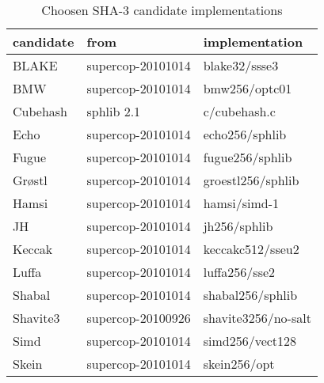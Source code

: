 \begin{table}
  \centering
  \begin{tabular}{ | l | l | l | }
    \hline
    \textbf{candidate} & \textbf{from} & \textbf{implementation} \\ \hline
     BLAKE      & supercop-20101014 & blake32/ssse3 \\ \hline
     \ac{BMW}   & supercop-20101014 & bmw256/optc01 \\ \hline
     Cubehash   & sphlib 2.1        & c/cubehash.c  \\ \hline
     Echo       & supercop-20101014 & echo256/sphlib\\ \hline
     Fugue      & supercop-20101014 & fugue256/sphlib\\ \hline
     Grøstl    & supercop-20101014 & groestl256/sphlib\\ \hline
     Hamsi      & supercop-20101014 & hamsi/simd-1  \\ \hline
     JH         & supercop-20101014 & jh256/sphlib  \\ \hline
     Keccak     & supercop-20101014 & keccakc512/sseu2 \\ \hline
     Luffa      & supercop-20101014 & luffa256/sse2 \\ \hline
     Shabal     & supercop-20101014 & shabal256/sphlib\\ \hline
     Shavite3   & supercop-20100926 & shavite3256/no-salt       \\ \hline
     Simd       & supercop-20101014 & simd256/vect128 \\ \hline
     Skein      & supercop-20101014 & skein256/opt           \\ \hline
  \end{tabular}
  \caption{Choosen \ac{SHA}-3 candidate implementations}
  \label{tbl:sha3:implementations}
\end{table}
